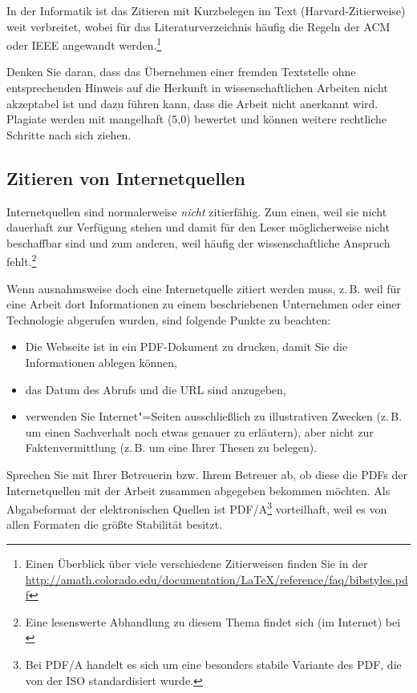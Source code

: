 \documentclass[a4paper,11pt,headings=normal]{scrartcl}
\begin{document}
In der Informatik ist das Zitieren mit Kurzbelegen im Text (Harvard-Zitierweise) weit verbreitet, wobei für das Literaturverzeichnis häufig die Regeln der \acs{ACM} oder \acs{IEEE} angewandt werden.\footnote{Einen Überblick über viele verschiedene Zitierweisen finden Sie in der \url{http://amath.colorado.edu/documentation/LaTeX/reference/faq/bibstyles.pdf}}

Denken Sie daran, dass das Übernehmen einer fremden Textstelle ohne entsprechenden Hinweis auf die Herkunft in wissenschaftlichen Arbeiten nicht akzeptabel ist und dazu führen kann, dass die Arbeit nicht anerkannt wird. Plagiate werden mit mangelhaft (5,0) bewertet und können weitere rechtliche Schritte nach sich ziehen.

\subsection{Zitieren von Internetquellen}
Internetquellen sind normalerweise \textit{nicht} zitierfähig. Zum einen, weil sie nicht dauerhaft zur Verfügung stehen und damit für den Leser möglicherweise nicht beschaffbar sind und zum anderen, weil häufig der wissenschaftliche Anspruch fehlt.\footnote{Eine lesenswerte Abhandlung zu diesem Thema findet sich (im Internet) bei \cite{Weber2006}}

Wenn ausnahmsweise doch eine Internetquelle zitiert werden muss, z.\,B. weil für eine Arbeit dort Informationen zu einem beschriebenen Unternehmen oder einer Technologie abgerufen wurden, sind folgende Punkte zu beachten:

\begin{itemize}
\item Die Webseite ist in ein PDF-Dokument zu drucken, damit Sie die Informationen ablegen können,
\item das Datum des Abrufs und die URL sind anzugeben,
\item verwenden Sie Internet"=Seiten ausschließlich zu illustrativen Zwecken (z.\,B. um einen Sachverhalt noch etwas genauer zu erläutern), aber nicht zur Faktenvermittlung (z.\,B. um eine Ihrer Thesen zu belegen).
\end{itemize}

Sprechen Sie mit Ihrer Betreuerin bzw. Ihrem Betreuer ab, ob diese die PDFs der Internetquellen mit der Arbeit zusammen abgegeben bekommen möchten. Als Abgabeformat der elektronischen Quellen ist PDF/A\footnote{Bei PDF/A handelt es sich um eine besonders stabile Variante des \ac{PDF}, die von der  \ac{ISO} standardisiert wurde.} vorteilhaft, weil es von allen Formaten die größte Stabilität besitzt.
\end{document}
